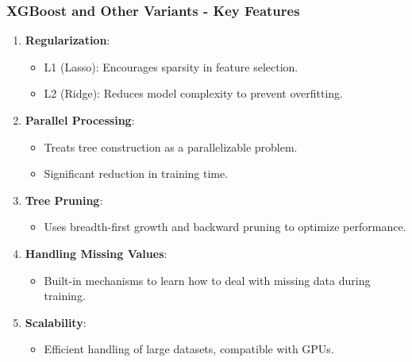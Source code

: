 \documentclass[aspectratio=169]{beamer}
\begin{document}
\begin{frame}
    \frametitle{XGBoost and Other Variants - Key Features}
    \begin{enumerate}
        \item \textbf{Regularization}:
            \begin{itemize}
                \item L1 (Lasso): Encourages sparsity in feature selection.
                \item L2 (Ridge): Reduces model complexity to prevent overfitting.
            \end{itemize}
        
        \item \textbf{Parallel Processing}:
            \begin{itemize}
                \item Treats tree construction as a parallelizable problem.
                \item Significant reduction in training time.
            \end{itemize}
        
        \item \textbf{Tree Pruning}:
            \begin{itemize}
                \item Uses breadth-first growth and backward pruning to optimize performance.
            \end{itemize}
        
        \item \textbf{Handling Missing Values}:
            \begin{itemize}
                \item Built-in mechanisms to learn how to deal with missing data during training.
            \end{itemize}
        
        \item \textbf{Scalability}:
            \begin{itemize}
                \item Efficient handling of large datasets, compatible with GPUs.
            \end{itemize}
    \end{enumerate}
\end{frame}
\end{document}
